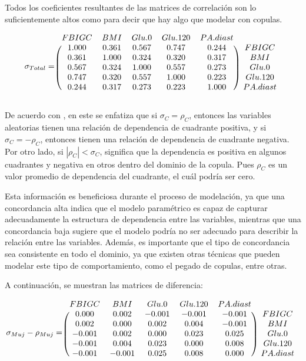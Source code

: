 Todos los coeficientes resultantes de las matrices de correlación son lo suficientemente altos como para decir que hay algo que modelar con copulas.

\[
\sigma_{Total} = \begin{blockarray}{cccccc}
FBIGC      &      BMI      &    Glu.0      &  Glu.120      & PA.diast \\
\begin{block}{(ccccc)c}
1.000 & 0.361 & 0.567 & 0.747 & 0.244 & FBIGC \\
0.361 & 1.000 & 0.324 & 0.320 & 0.317 & BMI \\
0.567 & 0.324 & 1.000 & 0.557 & 0.273 & Glu.0 \\
0.747 & 0.320 & 0.557 & 1.000 & 0.223 & Glu.120 \\
0.244 & 0.317 & 0.273 & 0.223 & 1.000 & PA.diast \\
\end{block}
\end{blockarray}
 \]


De acuerdo con \cite{Erdely2022}, en este se enfatiza que si $\sigma_{C} = \rho_{C}$, entonces las variables aleatorias tienen una relación de dependencia de cuadrante positiva, y si $\sigma_{C} = -\rho_{C}$, entonces tienen una relación de dependencia de cuadrante negativa. Por otro lado, si $ |\rho_C| < \sigma_C$, significa que la dependencia es positiva en algunos cuadrantes y negativa en otros dentro del dominio de la copula. Pues $\rho_{C}$ es un valor promedio de dependencia del cuadrante, el cuál podría ser cero.


Esta información es beneficiosa durante el proceso de modelación, ya que una concordancia alta indica que el modelo paramétrico es capaz de capturar adecuadamente la estructura de dependencia entre las variables, mientras que una concordancia baja sugiere que el modelo podría no ser adecuado para describir la relación entre las variables. Además, es importante que el tipo de concordancia sea consistente en todo el dominio, ya que existen otras técnicas que pueden modelar este tipo de comportamiento, como el pegado de copulas, entre otras.

A continuación, se muestran las matrices de diferencia:


\[
\sigma_{Muj} - \rho_{Muj} = \begin{blockarray}{cccccc}
FBIGC      &      BMI      &    Glu.0      &  Glu.120      & PA.diast \\
\begin{block}{(ccccc)c}
  0.000 & 0.002 & -0.001 & -0.001  & -0.001 & FBIGC \\
  0.002 & 0.000 &  0.002 &  0.004  & -0.001 & BMI \\
 -0.001 & 0.002 &  0.000 &  0.023  &  0.025 & Glu.0 \\
 -0.001 & 0.004 &  0.023 &  0.000  &  0.008 & Glu.120 \\
 -0.001 &-0.001 &  0.025 &  0.008  &  0.000 & PA.diast \\
\end{block}
\end{blockarray}
 \]

